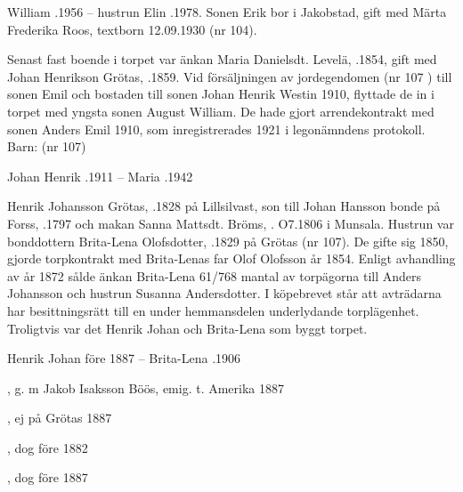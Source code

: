 William .1956  --  hustrun Elin .1978.
Sonen Erik bor i Jakobstad, gift med Märta Frederika Roos, textborn 12.09.1930 (nr 104).


Senast fast boende i torpet var änkan Maria Danielsdt. Levelä, .1854, gift med Johan Henrikson Grötas, .1859. Vid försäljningen av jordegendomen (nr 107 ) till sonen Emil och bostaden till sonen Johan Henrik Westin 1910, flyttade de in i torpet med yngsta sonen August William. De hade gjort arrendekontrakt med sonen Anders Emil 1910, som inregistrerades 1921 i legonämndens protokoll.  Barn: (nr 107)

Johan Henrik .1911  --  Maria .1942


Henrik Johansson Grötas, .1828 på Lillsilvast, son till Johan Hansson bonde på Forss, .1797 och makan Sanna Mattsdt. Bröms, . O7.1806 i Munsala. Hustrun var bonddottern Brita-Lena Olofsdotter, .1829 på Grötas (nr 107). De gifte sig 1850, gjorde torpkontrakt med Brita-Lenas far Olof Olofsson år 1854. Enligt avhandling av år 1872 sålde änkan Brita-Lena 61/768 mantal av torpägorna till Anders Johansson och hustrun Susanna Andersdotter. I köpebrevet står att avträdarna har besittningsrätt till en under hemmansdelen underlydande torplägenhet. Troligtvis var det Henrik Johan och Brita-Lena som byggt torpet.

Henrik Johan \textdied före 1887  --  Brita-Lena .1906
\begin{jhchildren}
  \item {}
  \item {}, g. m Jakob Isaksson Böös, emig. t. Amerika 1887
  \item {}
  \item {}
  \item {}
  \item {}, ej på Grötas 1887
  \item {}, dog före 1882
  \item {}, dog före 1887
\end{jhchildren}



